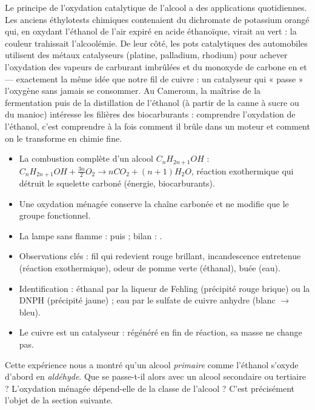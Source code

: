 \documentclass[11pt]{article}
\newcommand{\cle}[1]{{\popxbold\color{popdark}#1}}
\begin{document}
\begin{savaistu}
Le principe de l'oxydation catalytique de l'alcool a des applications quotidiennes. Les anciens \cle{éthylotests} chimiques contenaient du dichromate de potassium orangé qui, en oxydant l'éthanol de l'air expiré en acide éthanoïque, virait au vert : la couleur trahissait l'alcoolémie. De leur côté, les \cle{pots catalytiques} des automobiles utilisent des métaux catalyseurs (platine, palladium, rhodium) pour achever l'oxydation des vapeurs de carburant imbrûlées et du monoxyde de carbone en  et  — exactement la même idée que notre fil de cuivre : un catalyseur qui « passe » l'oxygène sans jamais se consommer. Au Cameroun, la maîtrise de la fermentation puis de la distillation de l'éthanol (à partir de la canne à sucre ou du manioc) intéresse les filières des biocarburants : comprendre l'oxydation de l'éthanol, c'est comprendre à la fois comment il brûle dans un moteur et comment on le transforme en chimie fine.
\end{savaistu}

\begin{aretenir}
\begin{itemize}
\item La \cle{combustion complète} d'un alcool $C_nH_{2n+1}OH$ : $C_nH_{2n+1}OH + \frac{3n}{2} O_2 \longrightarrow n CO_2 + (n+1) H_2O$, réaction exothermique qui détruit le squelette carboné (énergie, biocarburants).
\item Une \cle{oxydation ménagée} conserve la chaîne carbonée et ne modifie que le groupe fonctionnel.
\item La \cle{lampe sans flamme} :  puis  ; bilan : .
\item Observations clés : fil qui redevient rouge brillant, incandescence entretenue (réaction exothermique), odeur de pomme verte (éthanal), buée (eau).
\item Identification : éthanal par la liqueur de Fehling (précipité rouge brique) ou la DNPH (précipité jaune) ; eau par le sulfate de cuivre anhydre (blanc $\to$ bleu).
\item Le cuivre est un \cle{catalyseur} : régénéré en fin de réaction, sa masse ne change pas.
\end{itemize}
\end{aretenir}

Cette expérience nous a montré qu'un alcool \emph{primaire} comme l'éthanol s'oxyde d'abord en \emph{aldéhyde}. Que se passe-t-il alors avec un alcool secondaire ou tertiaire ? L'oxydation ménagée dépend-elle de la classe de l'alcool ? C'est précisément l'objet de la section suivante.
\end{document}
